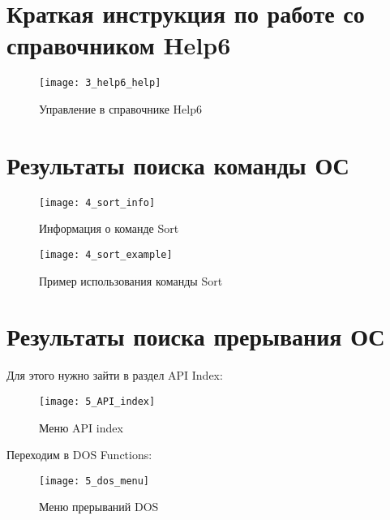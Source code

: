 \section{Краткая инструкция по работе со справочником Help6}

\begin{figure}[H]
  \begin{center}
    \texttt{[image: 3\_help6\_help]}
    \caption{Управление в справочнике Help6}
    \label{pic:pic_name}
  \end{center}
\end{figure}

\section{Результаты поиска команды ОС}

\begin{figure}[H]
  \begin{center}
    \texttt{[image: 4\_sort\_info]}
    \caption{Информация о команде Sort}
    \label{pic:pic_name}
  \end{center}
\end{figure}

\begin{figure}[H]
  \begin{center}
    \texttt{[image: 4\_sort\_example]}
    \caption{Пример использования команды Sort}
    \label{pic:pic_name}
  \end{center}
\end{figure}

\section{Результаты поиска прерывания ОС}

Для этого нужно зайти в раздел API Index:
\begin{figure}[H]
  \begin{center}
    \texttt{[image: 5\_API\_index]}
    \caption{Меню API index}
    \label{pic:pic_name}
  \end{center}
\end{figure}

Переходим в DOS Functions:
\begin{figure}[H]
  \begin{center}
    \texttt{[image: 5\_dos\_menu]}
    \caption{Меню прерываний DOS}
    \label{pic:pic_name}
  \end{center}
\end{figure}


